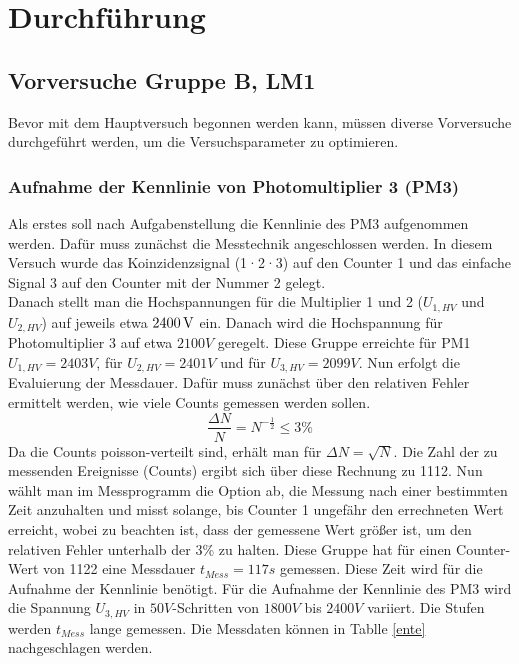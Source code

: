 \section{Durchführung}
    \subsection{Vorversuche Gruppe B, LM1}
        Bevor mit dem Hauptversuch begonnen werden kann, müssen diverse Vorversuche durchgeführt werden, um die Versuchsparameter zu optimieren.
        \subsubsection{Aufnahme der Kennlinie von Photomultiplier 3 (PM3)}
            Als erstes soll nach Aufgabenstellung die Kennlinie des PM3 aufgenommen werden. Dafür muss zunächst die Messtechnik angeschlossen werden. In diesem Versuch wurde das Koinzidenzsignal (1·2·3) auf den Counter 1 und das einfache Signal 3 auf den Counter mit der Nummer 2 gelegt.\\
            Danach stellt man die Hochspannungen für die Multiplier 1 und 2 ($U_{1,HV}$ und $U_{2,HV}$) auf jeweils etwa $\unit[2400]{V}$ ein. Danach wird die Hochspannung für Photomultiplier 3 auf etwa $2100\unit{V}$ geregelt. Diese Gruppe erreichte für PM1 $U_{1,HV} = 2403\unit{V}$, für $U_{2,HV} = 2401\unit{V}$ und für $U_{3,HV} = 2099\unit{V}$. 
            Nun erfolgt die Evaluierung der Messdauer. Dafür muss zunächst über den relativen Fehler ermittelt werden, wie viele Counts gemessen werden sollen. 
            $$ \frac{\Delta N}{N} = N^{-\frac{1}{2}} \leq 3\unit{\%}$$
            Da die Counts poisson-verteilt sind, erhält man für $\Delta N = \sqrt{N}$. Die Zahl der zu messenden Ereignisse (Counts) ergibt sich über diese Rechnung zu 1112. Nun wählt man im Messprogramm die Option ab, die Messung nach einer bestimmten Zeit anzuhalten und misst solange, bis Counter 1 ungefähr den errechneten Wert erreicht, wobei zu beachten ist, dass der gemessene Wert größer ist, um den relativen Fehler unterhalb der $3\unit{\%}$ zu halten. Diese Gruppe hat für einen Counter-Wert von 1122 eine Messdauer $t_{Mess} = 117\unit{s}$ gemessen. Diese Zeit wird für die Aufnahme der Kennlinie benötigt.
            Für die Aufnahme der Kennlinie des PM3 wird die Spannung $U_{3,HV}$ in $50\unit{V}$-Schritten von $1800\unit{V}$ bis $2400\unit{V}$ variiert. Die Stufen werden $t_{Mess}$ lange gemessen. Die Messdaten können in Tablle \ref{ente} nachgeschlagen werden. 
